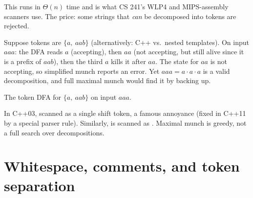 This runs in $\Theta(n)$ time and is what CS 241's WLP4 and MIPS-assembly scanners use. The
price: some strings that \emph{can} be decomposed into tokens are rejected.

\begin{example}
Suppose tokens are $\{a,\ aab\}$ (alternatively: C++ \code{>{}>} vs.\ nested templates). On
input $aaa$: the DFA reads $a$ (accepting), then $aa$ (not accepting, but still alive since
it is a prefix of $aab$), then the third $a$ kills it after $aa$. The state for $aa$ is not
accepting, so simplified munch reports an error. Yet $aaa = a\cdot a\cdot a$ is a valid
decomposition, and full maximal munch would find it by backing up.
\end{example}
\begin{center}

\small The token DFA for $\{a,\ aab\}$ on input $aaa$.
\end{center}

\begin{example}
In C++03,  scanned \code{>{}>} as a single shift token, a famous
annoyance (fixed in C++11 by a special parser rule). Similarly,  is scanned as
. Maximal munch is greedy, not a full search over decompositions.
\end{example}

\section{Whitespace, comments, and token separation}

